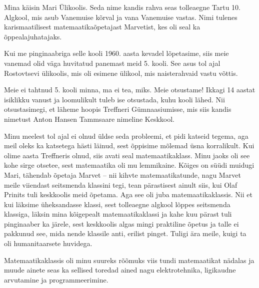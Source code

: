 

Mina käisin Mari Ülikoolis. Seda
nime kandis rahva seas tolleaegne Tartu 10. Algkool, mis asub Vanemuise 
kõrval ja vana Vanemuise vastas. Nimi tulenes karismaatilisest 
matemaatikaõpetajast Marvetist, kes oli seal ka õppealajuhatajaks.

Kui me pinginaabriga selle kooli 1960. aasta kevadel lõpetasime, siis 
meie vanemad olid väga huvitatud panemast meid 5. kooli. See asus tol ajal Rostovtsevi ülikoolis, mis oli esimene 
ülikool, mis naisterahvaid vastu võttis. 

Meie ei tahtnud 5. kooli minna, ma ei tea, miks. Meie otsustame! 
Ikkagi 14 aastat isiklikku vanust ja loomulikult tuleb ise otsustada, kuhu kooli 
lähed. Nii otsustasimegi, et läheme hoopis 
Treffneri Gümnaasiumisse, mis siis kandis 
nimetust Anton Hansen Tammsaare nimeline Keskkool. 

Minu meelest tol ajal ei 
olnud üldse seda probleemi, et pidi katseid tegema, aga 
meil oleks ka katsetega hästi läinud, sest õppisime mõlemad üsna 
korralikult. Kui olime aasta Treffneris olnud, siis avati seal 
matemaatikaklass. Minu jaoks oli see kohe sirge otsetee, sest
matemaatika oli mu lemmikaine. Kõiges on süüdi muidugi Mari, tähendab õpetaja 
Marvet -- nii kihvte matemaatikatunde, 
nagu Marvet meile viiendast seitsmenda klassini tegi, tean pärastisest ainult siis, 
kui Olaf Prinits tuli keskkoolis meid õpetama. Aga 
see oli juba matemaatikaklassis. Nii et kui läksime üheksandasse klassi, sest 
tolleaegne algkool lõppes seitsmenda klassiga, läksin mina kõigepealt matemaatikaklassi ja kahe kuu pärast tuli pinginaaber ka järele, sest 
keskkoolis algas mingi praktiline õpetus ja talle ei pakkunud see, mida nende 
klassile anti, erilist pinget. Tuligi ära meile, 
kuigi ta oli humanitaarsete huvidega. 

Matemaatikaklassis oli minu suureks rõõmuks viis tundi matemaatikat nädalas 
ja muude ainete seas ka sellised toredad ained nagu elektrotehnika, ligikaudne 
arvutamine ja programmeerimine. 


